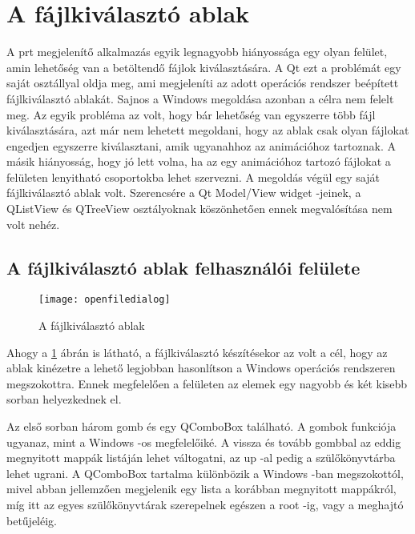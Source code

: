 \section{A fájlkiválasztó ablak}

A prt megjelenítő alkalmazás 
egyik legnagyobb hiányossága egy olyan felület, 
amin lehetőség van a betöltendő fájlok kiválasztására. 
A Qt ezt a problémát egy saját osztállyal oldja meg, 
ami megjeleníti az adott operációs rendszer 
beépített fájlkiválasztó ablakát. 
Sajnos a Windows megoldása azonban a célra nem felelt meg.
Az egyik probléma az volt,
hogy bár lehetőség van egyszerre több fájl kiválasztására, 
azt már nem lehetett megoldani, 
hogy az ablak csak olyan fájlokat engedjen egyszerre kiválasztani, 
amik ugyanahhoz az animációhoz tartoznak.
A másik hiányosság, hogy jó lett volna, 
ha az egy animációhoz tartozó fájlokat
a felületen lenyitható csoportokba lehet szervezni. 
A megoldás végül egy saját fájlkiválasztó ablak volt. 
Szerencsére a Qt Model/View widget -jeinek, a {\ttfamily QListView}
és {\ttfamily QTreeView} osztályoknak köszönhetően
ennek megvalósítása nem volt nehéz.

\subsection{A fájlkiválasztó ablak felhasználói felülete}

\begin{figure}[!htb]
\centering
\texttt{[image: openfiledialog]}
\caption{A fájlkiválasztó ablak}
\label{fig:x openFileDialog}
\end{figure}

Ahogy a \ref{fig:x openFileDialog} ábrán is látható, 
a fájlkiválasztó készítésekor az volt a cél, 
hogy az ablak kinézetre a lehető legjobban hasonlítson 
a Windows operációs rendszeren megszokottra. 
Ennek megfelelően a felületen az elemek egy nagyobb 
és két kisebb sorban helyezkednek el.

Az első sorban három gomb és egy {\ttfamily QComboBox} található. 
A gombok funkciója ugyanaz, mint a Windows -os megfelelőiké. 
A vissza és tovább gombbal az eddig megnyitott mappák listáján lehet váltogatni, 
az up -al pedig a szülőkönyvtárba lehet ugrani. 
A {\ttfamily QComboBox} tartalma különbözik a Windows -ban megszokottól, 
mivel abban jellemzően megjelenik egy lista a korábban megnyitott mappákról, 
míg itt az egyes szülőkönyvtárak szerepelnek egészen a root -ig, 
vagy a meghajtó betűjeléig.

